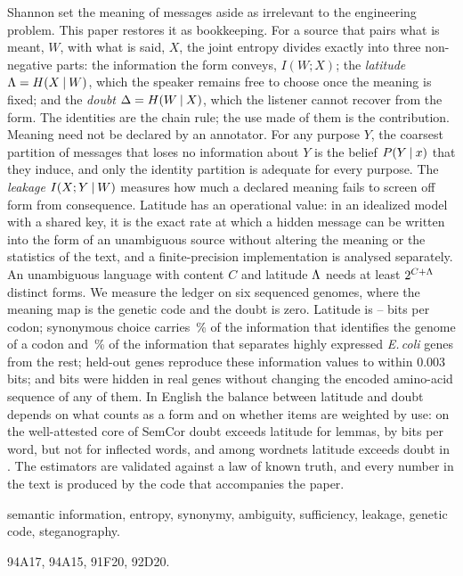 \documentclass[11pt,a4paper]{article}
\begin{document}
\begin{minipage}{\textwidth}
\small
{}\enspace
Shannon set the meaning of messages aside as irrelevant to the engineering problem. This paper restores it as bookkeeping.
For a source that pairs what is meant, $W$, with what is said, $X$, the joint entropy divides exactly into three non-negative parts:
the information the form conveys, $I(W;X)$; the \emph{latitude} $\Lambda=H(X\mathbin{\vert} W)$, which the speaker remains free to choose once the meaning is fixed;
and the \emph{doubt} $\Delta=H(W\mathbin{\vert} X)$, which the listener cannot recover from the form. The identities are the chain rule; the use made of them is the contribution.
Meaning need not be declared by an annotator. For any purpose $Y$, the coarsest partition of messages that loses no information about $Y$ is the belief $P(Y\mathbin{\vert} x)$ that they induce,
and only the identity partition is adequate for every purpose. The \emph{leakage} $I(X;Y\mathbin{\vert} W)$ measures how much a declared meaning fails to screen off form from consequence.
Latitude has an operational value: in an idealized model with a shared key, it is the exact rate at which a hidden message can be written into the form of an unambiguous source without altering the meaning or the statistics of the text, and a finite-precision implementation is analysed separately.
An unambiguous language with content $C$ and latitude $\Lambda$ needs at least $2^{C+\Lambda}$ distinct forms.
We measure the ledger on six sequenced genomes, where the meaning map is the genetic code and the doubt is zero. Latitude is \SminGenome--\SmaxGenome{} bits per codon;
synonymous choice carries \PanelFrac\,\% of the information that identifies the genome of a codon and \HegFrac\,\% of the information that separates highly expressed \emph{E.\,coli} genes from the rest;
held-out genes reproduce these information values to within 0.003 bits; and \EmbBits{} bits were hidden in \EmbGenes{} real genes without changing the encoded amino-acid sequence of any of them.
In English the balance between latitude and doubt depends on what counts as a form and on whether items are weighted by use: on the well-attested core of SemCor doubt exceeds latitude for lemmas, by \SemDmSTwenty{} bits per word, but not for inflected words, and among \InvN{} wordnets latitude exceeds doubt in \InvLatGreater{}.
The estimators are validated against a law of known truth, and every number in the text is produced by the code that accompanies the paper.\par
\medskip
{}\enspace semantic information, entropy, synonymy, ambiguity, sufficiency, leakage, genetic code, steganography.\par
{}\enspace 94A17, 94A15, 91F20, 92D20.\par
\end{minipage}
\end{document}

